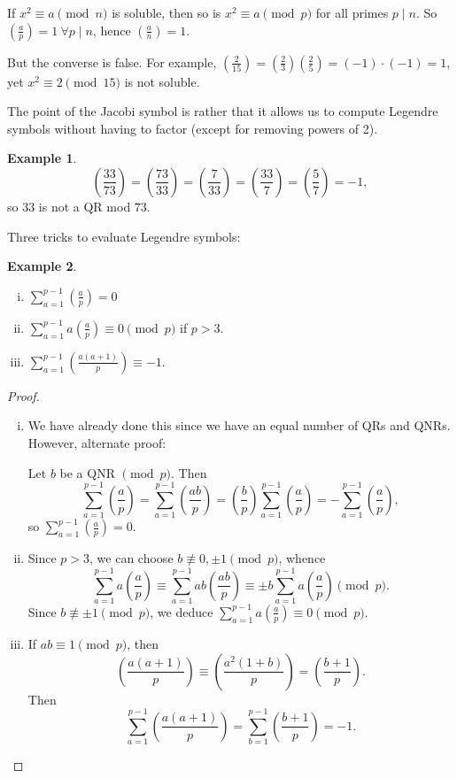 \documentclass{article}
\theoremstyle{definition}
\newtheorem{example}{Example}[section]
\begin{document}
If $x^2 \equiv a\pmod{n}$ is soluble, then so is $x^2\equiv  a \pmod{p}$ for all primes $p \mid n$. So $\left(\frac{a}{p} \right) = 1 ~\forall p \mid n$, hence $\left(\frac{a}{n} \right) = 1$.

But the converse is false. For example, $\left(\frac{2}{15} \right) = \left(\frac{2}{3} \right) \left(\frac{2}{5} \right) = (-1)\cdot (-1) = 1$, yet $x^2 \equiv 2 \pmod{15}$ is not soluble.

The point of the Jacobi symbol is rather that it allows us to compute Legendre symbols without having to factor (except for removing powers of 2).
\begin{example}
    \[
    \left(\frac{33}{73} \right) = \left(\frac{73}{33} \right) = \left(\frac{7}{33} \right) = \left(\frac{33}{7} \right) = \left(\frac{5}{7} \right) = -1, 
    \]    
    so $33$ is not a QR mod $73$.
\end{example}

Three tricks to evaluate Legendre symbols:
\begin{example}
    \begin{enumerate}[(i)]
        \item $\sum_{a=1}^{p-1} \left(\frac{a}{p} \right) = 0$
        \item $\sum_{a=1}^{p-1} a \left(\frac{a}{p} \right) \equiv 0\pmod{p}$ if $p > 3$.
        \item $\sum_{a=1}^{p-1} \left(\frac{a(a+1)}{p} \right) \equiv -1$.
    \end{enumerate}
\end{example}
\begin{proof}
    \begin{enumerate}[(i)]
        \item We have already done this since we have an equal number of QRs and QNRs. However, alternate proof:
        \vspace{1mm}
        
        Let $b$ be a QNR $\pmod{p}$. Then 
        \[
        \sum_{a=1}^{p-1} \left(\frac{a}{p} \right) = \sum_{a=1}^{p-1} \left(\frac{ab}{p} \right) = \left(\frac{b}{p} \right) \sum_{a=1}^{p-1} \left(\frac{a}{p} \right) = - \sum_{a=1}^{p-1} \left(\frac{a}{p} \right), 
        \]
        so $\sum_{a=1}^{p-1} \left(\frac{a}{p} \right) = 0$.
        \item Since $p>3$, we can choose $b \not\equiv 0, \pm 1 \pmod{p}$, whence \[
        \sum_{a=1}^{p-1} a \left(\frac{a}{p} \right) \equiv  \sum_{a=1}^{p-1} ab \left(\frac{ab}{p} \right) \equiv  \pm b \sum_{a=1}^{p-1} a \left(\frac{a}{p} \right) \pmod{p}.
        \]
        Since $b \not\equiv \pm 1 \pmod{p}$, we deduce $\sum_{a=1}^{p-1} a \left(\frac{a}{p} \right) \equiv 0 \pmod{p}$.
        \item  If $ab \equiv 1\pmod{p}$, then \[
        \left(\frac{a(a+1)}{p} \right) \equiv \left(\frac{a^2(1+b)}{p} \right) = \left(\frac{b+1}{p} \right).  
        \]
        Then \[
        \sum_{a=1}^{p-1} \left(\frac{a(a+1)}{p} \right) = \sum_{b=1}^{p-1} \left(\frac{b+1}{p} \right) = -1.
        \]
    \end{enumerate}
\end{proof}
\end{document}
